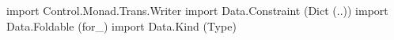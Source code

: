 \begin{code}
import Control.Monad.Trans.Writer
import Data.Constraint (Dict (..))
import Data.Foldable (for_)
import Data.Kind (Type)
\end{code}
